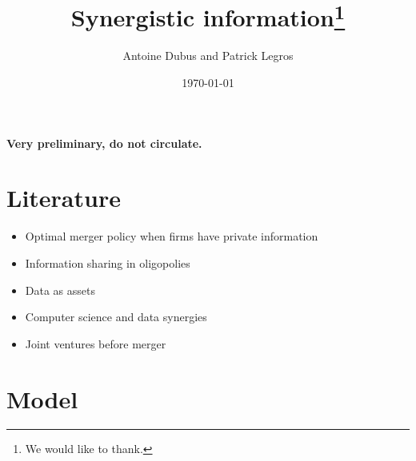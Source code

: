 \documentclass[a4paper]{article}
\begin{document}
\title{Synergistic information\thanks{We would like to thank.}}
\author{Antoine Dubus and Patrick Legros}
\date{\today}


\maketitle

\begin{abstract}

\noindent 

\end{abstract}
 
\textbf{Very preliminary, do not circulate.}

\baselineskip0.7cm

\section{Literature}
\begin{itemize}\setlength\itemsep{-1em}
    \item Optimal merger policy when firms have private information \cite{Besanko1993}
    \item Information sharing in oligopolies
    \item Data as assets
    \item Computer science and data synergies
    \item Joint ventures before merger
\end{itemize}

\section{Model}
\end{document}
